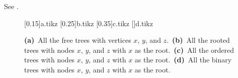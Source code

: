 See .
\begin{figure}[htb]
    \subcaptionbox{\label{fig:B.5-1a}}[0.15\textwidth]{{a.tikz}}
    \subcaptionbox{\label{fig:B.5-1b}}[0.25\textwidth]{{b.tikz}}
    \subcaptionbox{\label{fig:B.5-1c}}[0.35\textwidth]{{c.tikz}}
    \subcaptionbox{\label{fig:B.5-1d}}[\textwidth]{{d.tikz}}
    \caption{\textbf{(a)}\, All the free trees with vertices $x$, $y$, and $z$.\,
    \textbf{(b)}\, All the rooted trees with nodes $x$, $y$, and $z$ with $x$ as the root.\,
    \textbf{(c)}\, All the ordered trees with nodes $x$, $y$, and $z$ with $x$ as the root.\,
    \textbf{(d)}\, All the binary trees with nodes $x$, $y$, and $z$ with $x$ as the root.} \label{fig:B.5-1}
\end{figure}
